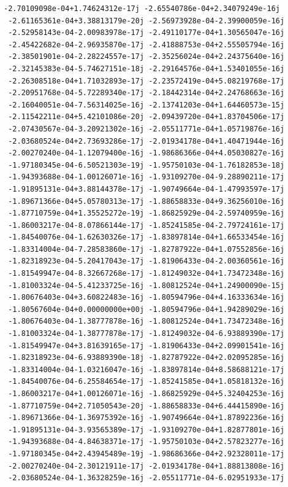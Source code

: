 \documentclass[12pt]{article}
\begin{document}
\begin{lstlisting}[caption=Results in vector form, label=lst:result]
 -2.70109098e-04+1.74624312e-17j -2.65540786e-04+2.34079249e-16j
 -2.61165361e-04+3.38813179e-20j -2.56973928e-04-2.39900059e-16j
 -2.52958143e-04-2.00983978e-17j -2.49110177e-04+1.30565047e-16j
 -2.45422682e-04-2.96935870e-17j -2.41888753e-04+2.55505794e-16j
 -2.38501901e-04-2.28224557e-17j -2.35256024e-04+2.24375640e-16j
 -2.32145383e-04-5.74627151e-18j -2.29164576e-04+1.53401055e-16j
 -2.26308518e-04+1.71032893e-17j -2.23572419e-04+5.08219768e-17j
 -2.20951768e-04-5.72289340e-17j -2.18442314e-04+2.24768663e-16j
 -2.16040051e-04-7.56314025e-16j -2.13741203e-04+1.64460573e-15j
 -2.11542211e-04+5.42101086e-20j -2.09439720e-04+1.83704506e-17j
 -2.07430567e-04-3.20921302e-16j -2.05511771e-04+1.05719876e-16j
 -2.03680524e-04+2.73693286e-17j -2.01934178e-04+1.40471944e-16j
 -2.00270240e-04-1.12079400e-16j -1.98686366e-04+4.05030827e-16j
 -1.97180345e-04-6.50521303e-19j -1.95750103e-04-1.76182853e-18j
 -1.94393688e-04-1.00126071e-16j -1.93109270e-04-9.28890211e-17j
 -1.91895131e-04+3.88144378e-17j -1.90749664e-04-1.47993597e-17j
 -1.89671366e-04+5.05780313e-17j -1.88658833e-04+9.36256010e-16j
 -1.87710759e-04+1.35525272e-19j -1.86825929e-04-2.59740959e-16j
 -1.86003217e-04-8.07866144e-17j -1.85241585e-04-2.79724161e-17j
 -1.84540076e-04-1.62630326e-17j -1.83897814e-04+1.66533454e-16j
 -1.83314004e-04-7.28583860e-17j -1.82787922e-04+1.07552856e-16j
 -1.82318923e-04-5.20417043e-17j -1.81906433e-04-2.00360561e-16j
 -1.81549947e-04-8.32667268e-17j -1.81249032e-04+1.73472348e-16j
 -1.81003324e-04-5.41233725e-16j -1.80812524e-04+1.24900090e-15j
 -1.80676403e-04+3.60822483e-16j -1.80594796e-04+4.16333634e-16j
 -1.80567604e-04+0.00000000e+00j -1.80594796e-04+1.94289029e-16j
 -1.80676403e-04-1.38777878e-16j -1.80812524e-04+1.73472348e-16j
 -1.81003324e-04-1.38777878e-17j -1.81249032e-04-6.93889390e-17j
 -1.81549947e-04+3.81639165e-17j -1.81906433e-04+2.09901541e-16j
 -1.82318923e-04-6.93889390e-18j -1.82787922e-04+2.02095285e-16j
 -1.83314004e-04-1.03216047e-16j -1.83897814e-04+8.58688121e-17j
 -1.84540076e-04-6.25584654e-17j -1.85241585e-04+1.05818132e-16j
 -1.86003217e-04+1.00126071e-16j -1.86825929e-04+5.32404253e-16j
 -1.87710759e-04+2.71050543e-20j -1.88658833e-04+6.44415890e-16j
 -1.89671366e-04-1.36975392e-16j -1.90749664e-04+1.87892236e-16j
 -1.91895131e-04-3.93565389e-17j -1.93109270e-04+1.82877801e-16j
 -1.94393688e-04-4.84638371e-17j -1.95750103e-04+2.57823277e-16j
 -1.97180345e-04+2.43945489e-19j -1.98686366e-04+2.92328011e-17j
 -2.00270240e-04-2.30121911e-17j -2.01934178e-04+1.88813808e-16j
 -2.03680524e-04-1.36328259e-16j -2.05511771e-04-6.02951933e-17j

\end{lstlisting}
\end{document}
